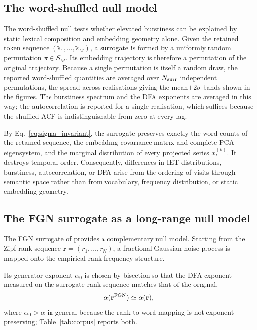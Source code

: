 \documentclass[12pt,a4paper]{article}
\newcommand{\xtk}{x_t^{(k)}}
\begin{document}
\subsection{The word-shuffled null model}
\label{sec:null_model_shuffle}

The word-shuffled null tests whether elevated burstiness can be
explained by static lexical composition and embedding geometry alone.
Given the retained token sequence $(\tilde s_1,\ldots,\tilde s_M)$, a
surrogate is formed by a uniformly random permutation
$\pi\in S_M$.
Its embedding trajectory is therefore a permutation of the original
trajectory. Because a single permutation is itself a random draw, the reported
word-shuffled quantities are averaged over $N_{\rm surr}$ independent
permutations, the spread across realisations giving the mean$\pm2\sigma$
bands shown in the figures. The burstiness spectrum and the DFA
exponents are averaged in this way; the autocorrelation is reported for
a single realisation, which suffices because the shuffled ACF is
indistinguishable from zero at every lag.

By Eq.~\eqref{eq:sigma_invariant}, the surrogate preserves exactly the
word counts of the retained sequence, the embedding covariance matrix
and complete PCA eigensystem, and the marginal distribution of every
projected series $\xtk$.
It destroys temporal order.
Consequently, differences in IET distributions, burstiness,
autocorrelation, or DFA arise from the ordering of visits through
semantic space rather than from vocabulary, frequency distribution, or
static embedding geometry.

\subsection{The FGN surrogate as a long-range null model}
\label{sec:null_model_fgn}

The FGN surrogate of \citet{DegliEsposti2025} provides a complementary
null model.
Starting from the Zipf-rank sequence
$\mathbf{r}=(r_1,\ldots,r_N)$, a fractional Gaussian noise process is
mapped onto the empirical rank-frequency structure.

Its generator exponent $\alpha_0$ is chosen by bisection so that the DFA
exponent measured on the surrogate rank sequence matches that of the
original,
\begin{equation}
  \alpha(\mathbf{r}^{\rm FGN})\simeq\alpha(\mathbf{r}),
  \label{eq:fgn_dfa_match}
\end{equation}
where $\alpha_0>\alpha$ in general because the rank-to-word mapping is
not exponent-preserving; Table~\ref{tab:corpus} reports both.
\end{document}
